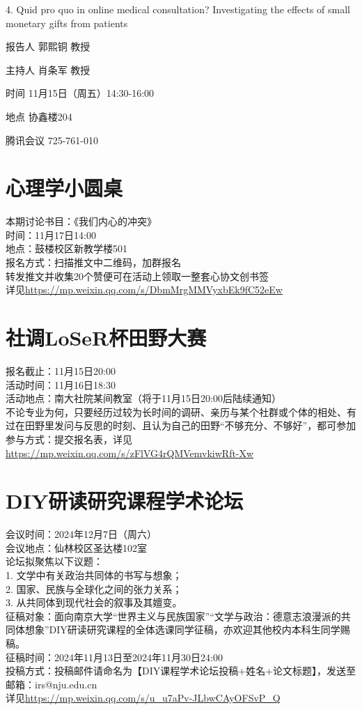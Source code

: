 \documentclass[letterpaper, 12pt]{article}
\begin{document}
\begin{multicols}{2}
4. Quid pro quo in online medical consultation? Investigating the effects of small monetary gifts from patients

报告人 郭熙铜 教授

主持人 肖条军 教授

时间 11月15日（周五）14:30-16:00

地点 协鑫楼204

腾讯会议 725-761-010
\section{心理学小圆桌}
本期讨论书目：《我们内心的冲突》\\
时间：11月17日14:00\\
地点：鼓楼校区新教学楼501\\
报名方式：扫描推文中二维码，加群报名\\
转发推文并收集20个赞便可在活动上领取一整套心协文创书签\\
详见\url{https://mp.weixin.qq.com/s/DbmMrgMMVyxbEk9fC52eEw}

\section{社调LoSeR杯田野大赛}
报名截止：11月15日20:00\\
活动时间：11月16日18:30\\
活动地点：南大社院某间教室（将于11月15日20:00后陆续通知）\\
不论专业为何，只要经历过较为长时间的调研、亲历与某个社群或个体的相处、有过在田野里发问与反思的时刻、且认为自己的田野“不够充分、不够好”，都可参加\\
参与方式：提交报名表，详见\url{https://mp.weixin.qq.com/s/zFlVG4rQMVemvkiwRft-Xw}

\section{DIY研读研究课程学术论坛}
会议时间：2024年12月7日（周六）\\
会议地点：仙林校区圣达楼102室\\
论坛拟聚焦以下议题：\\
1. 文学中有关政治共同体的书写与想象；\\
2. 国家、民族与全球化之间的张力关系；\\
3. 从共同体到现代社会的叙事及其嬗变。\\
征稿对象：面向南京大学“世界主义与民族国家”“文学与政治：德意志浪漫派的共同体想象”DIY研读研究课程的全体选课同学征稿，亦欢迎其他校内本科生同学赐稿。\\
征稿时间：2024年11月13日至2024年11月30日24:00\\
投稿方式：投稿邮件请命名为【DIY课程学术论坛投稿+姓名+论文标题】，发送至邮箱：irs@nju.edu.cn\\
详见\url{https://mp.weixin.qq.com/s/u_u7aPv-JLbwCAyOFSvP_Q}


\end{multicols}
\end{document}
